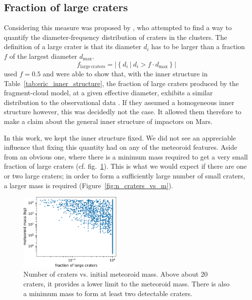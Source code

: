 \subsection{Fraction of large craters}
Considering this measure was proposed by \cite{newland2019CFM18}, who attempted to find a way to quantify the diameter-frequency distribution of craters in the clusters. The definition of a large crater is that its diameter $d_i$ has to be larger than a fraction $f$ of the largest diameter $d_\mathrm{max}$.
\begin{equation}
    f_\mathrm{large\,craters} = \left|\left\{d_i\ \big|\ d_i > f\cdot d_\mathrm{max}\right\}\right|
\end{equation}
\cite{newland2019CFM18} used $f = 0.5$ and were able to show that, with the inner structure in Table~\ref{tab:eric_inner_structure}, the fraction of large craters produced by the fragment-cloud model, at a given effective diameter, exhibits a similar distribution to the observational data \citep{daubar2019recently}. If they assumed a homogeneous inner structure however, this was decidedly not the case. It allowed them therefore to make a claim about the general inner structure of impactors on Mars.

In this work, we kept the inner structure fixed. We did not see an appreciable influence that fixing this quantity had on any of the meteoroid features.
Aside from an obvious one, where there is a minimum mass required to get a very small fraction of large craters (cf. fig.~\ref{fig:f_large_vs_mass}). This is what we would expect if there are one or two large craters; in order to form a sufficiently large number of small craters, a larger mass is required (Figure~\ref{fig:n_craters_vs_m}).

\begin{figure}[htbp]
    \centering
    \includegraphics[width=0.45\textwidth]{figures/f_large_vs_mass}
    \caption{Number of craters vs. initial meteoroid mass. Above about 20 craters, it provides a lower limit to the meteoroid mass. There is also a minimum mass to form at least two detectable craters.}
    \label{fig:f_large_vs_mass}
\end{figure}

